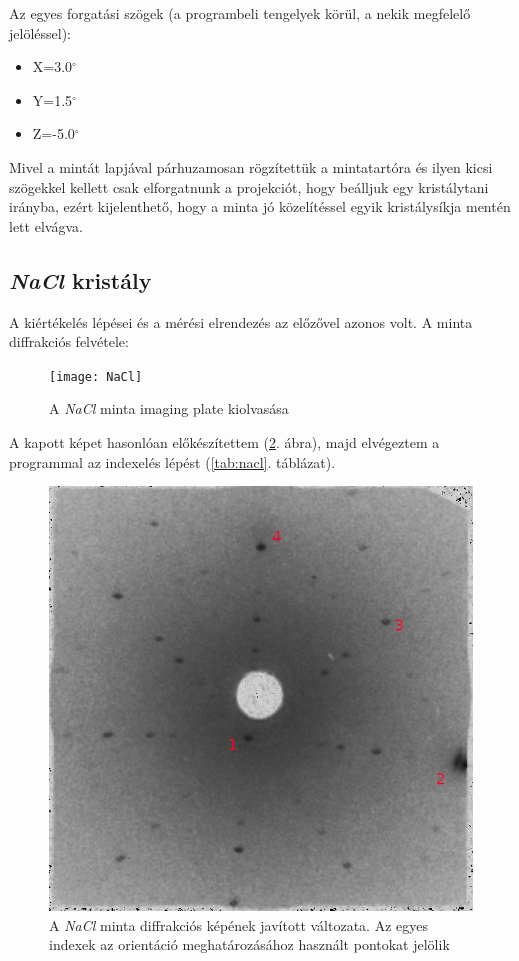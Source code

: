 \documentclass[12pt,a4paper]{article}
\begin{document}
\newline
Az egyes forgatási szögek (a programbeli tengelyek körül, a nekik megfelelő jelöléssel):\\
\begin{itemize}
\item{X=3.0$^{\circ}$}
\item{Y=1.5$^{\circ}$}
\item{Z=-5.0$^{\circ}$}
\end{itemize}

Mivel a mintát lapjával párhuzamosan rögzítettük a mintatartóra és ilyen kicsi szögekkel kellett csak elforgatnunk a projekciót, hogy beálljuk egy kristálytani irányba, ezért kijelenthető, hogy a minta jó közelítéssel egyik kristálysíkja mentén lett elvágva.
\newpage
\subsection{\emph{NaCl} kristály}
\hspace*{10pt} A kiértékelés lépései és a mérési elrendezés az előzővel azonos volt. A minta diffrakciós felvétele:\\
\begin{figure}[!h]
\centering
\texttt{[image: NaCl]}
\caption{A \emph{NaCl} minta imaging plate kiolvasása}
\label{nacl:unproc}
\end{figure}
\newline
A kapott képet hasonlóan előkészítettem (\ref{fig:nacl_proc}. ábra), majd elvégeztem a programmal az indexelés lépést (\ref{tab:nacl}. táblázat). \\

\begin{figure}[!h]
\centering
\includegraphics[scale=1.8]{nacl_proc}
\caption{A \emph{NaCl} minta diffrakciós képének javított változata. Az egyes indexek az orientáció meghatározásához használt pontokat jelölik}
\label{fig:nacl_proc}
\end{figure}
\end{document}
